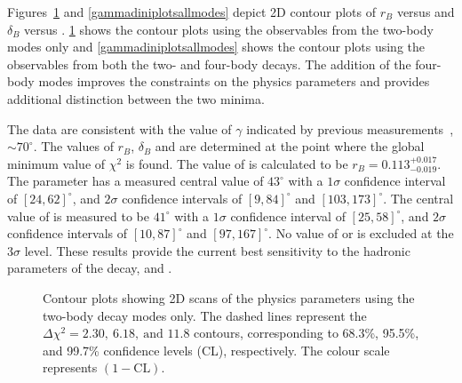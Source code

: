 Figures~\ref{gammadiniplots2body} and \ref{gammadiniplotsallmodes} depict 2D contour plots of $r_B$ versus \Pgamma and $\delta_B$ versus \Pgamma. \Fig\ref{gammadiniplots2body} shows the contour plots using the \CP observables from the two-body modes only and \fig\ref{gammadiniplotsallmodes} shows the contour plots using the \CP observables from both the two- and four-body decays. The addition of the four-body modes improves the constraints on the physics parameters and provides additional distinction between the two minima. 

The data are consistent with the value of $\gamma$ indicated by previous measurements~\cite{LHCb-PAPER-2016-032, CKMFitter}, $\sim 70^\circ$. The values of $r_B$, $\delta_B$ and \Pgamma are determined at the point where the global minimum value of $\chi^2$ is found. The value of \rb is calculated to be $r_B = 0.113^{+0.017}_{-0.019}$. The parameter \deltab has a measured central value of $43^{\circ}$ with a $1\sigma$ confidence interval of $[24, 62]^{\circ}$, and $2\sigma$ confidence intervals of $[9, 84]^{\circ}$ and $[103,173]^{\circ}$. The central value of \Pgamma is measured to be $41^{\circ}$ with a $1\sigma$ confidence interval of $[25, 58]^{\circ}$, and $2\sigma$ confidence intervals of $[10, 87]^{\circ}$ and $[97,167]^{\circ}$. No value of \Pgamma or \deltab is excluded at the $3\sigma$ level. These results provide the current best sensitivity to the hadronic parameters of the \Bm decay, \rb and \deltab.

\begin{figure}[h]
\centering
{}
\caption{Contour plots showing 2D scans of the physics parameters using the two-body \Dz decay modes only. The dashed lines represent the $\Delta \chi^2 = 2.30,\ 6.18,\ \text{and } 11.8$ contours, corresponding to 68.3\%, 95.5\%, and 99.7\% confidence levels (CL), respectively. The colour scale represents $(1 - \text{CL})$.}
\label{gammadiniplots2body}
\end{figure}

